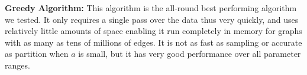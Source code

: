 \textbf{Greedy Algorithm:} This algorithm is the all-round best performing algorithm we tested.
It only requires a single pass over the data thus very quickly,  and uses
relatively little amounts of space enabling it run completely in memory for graphs with
as many as tens of millions of edges. It is not as fast as sampling or accurate as partition
when $a$ is small, but it has very good performance over all parameter ranges.
